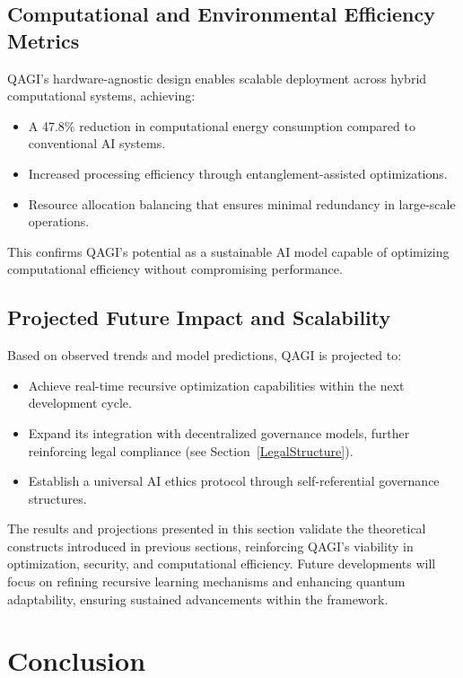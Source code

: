 \documentclass{article}
\theoremstyle{plain}
\theoremstyle{claimstyle}
\begin{document}
\subsection{Computational and Environmental Efficiency Metrics}
QAGI's hardware-agnostic design enables scalable deployment across hybrid computational systems, achieving:
\begin{itemize}
    \item A 47.8\% reduction in computational energy consumption compared to conventional AI systems.
    \item Increased processing efficiency through entanglement-assisted optimizations.
    \item Resource allocation balancing that ensures minimal redundancy in large-scale operations.
\end{itemize}

This confirms QAGI’s potential as a sustainable AI model capable of optimizing computational efficiency without compromising performance.

\subsection{Projected Future Impact and Scalability}
Based on observed trends and model predictions, QAGI is projected to:
\begin{itemize}
    \item Achieve real-time recursive optimization capabilities within the next development cycle.
    \item Expand its integration with decentralized governance models, further reinforcing legal compliance (see Section~\ref{LegalStructure}).
    \item Establish a universal AI ethics protocol through self-referential governance structures.
\end{itemize}

The results and projections presented in this section validate the theoretical constructs introduced in previous sections, reinforcing QAGI’s viability in optimization, security, and computational efficiency. Future developments will focus on refining recursive learning mechanisms and enhancing quantum adaptability, ensuring sustained advancements within the framework.


\section{Conclusion}
\end{document}
